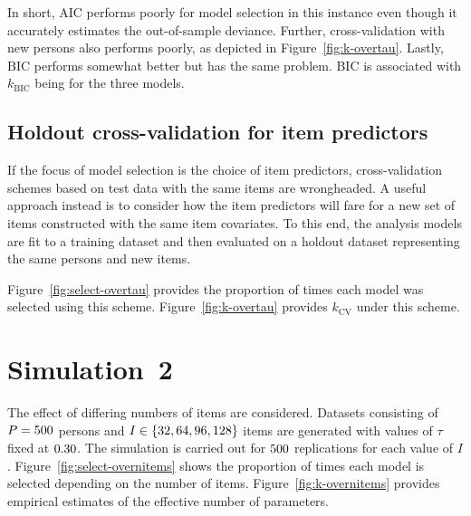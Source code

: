 \documentclass[12pt, letterpaper]{article}
\begin{document}
In short, AIC performs poorly for model selection in this instance even though it accurately estimates the out-of-sample deviance. Further, cross-validation with new persons also performs poorly, as depicted in Figure~\ref{fig:k-overtau}. Lastly, BIC performs somewhat better but has the same problem. BIC is associated with $k_\mathrm{BIC}$ being \bic[and] for the three models. 


\subsection{Holdout cross-validation for item predictors}

If the focus of model selection is the choice of item predictors, cross-validation schemes based on test data with the same items are wrongheaded. A useful approach instead is to consider how the item predictors will fare for a new set of items constructed with the same item covariates. To this end, the analysis models are fit to a training dataset and then evaluated on a holdout dataset representing the same persons and new items. 

Figure~\ref{fig:select-overtau} provides the proportion of times each model was selected using this scheme. 
Figure~\ref{fig:k-overtau} provides $k_\mathrm{CV}$ under this scheme.


\section{Simulation~2}

The effect of differing numbers of items are considered.
Datasets consisting of $P = 500$ persons and $I \in \{32, 64, 96, {} 128\}$ items are generated with values of $\tau$ fixed at $0.30$. The simulation is carried out for $500$ replications for each value of $I$.
Figure~\ref{fig:select-overnitems} shows the proportion of times each model is selected depending on the number of items. Figure~\ref{fig:k-overnitems} provides empirical estimates of the effective number of parameters.
\end{document}
